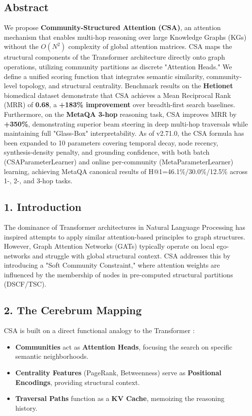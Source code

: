 
\subsection*{Abstract}
We propose \textbf{Community-Structured Attention (CSA)}, an attention mechanism that enables multi-hop reasoning over large Knowledge Graphs (KGs) without the $O(N^2)$ complexity of global attention matrices. CSA maps the structural components of the Transformer architecture \cite{vaswani2017attention} directly onto graph operations, utilizing community partitions as discrete "Attention Heads." We define a unified scoring function that integrates semantic similarity, community-level topology, and structural centrality. Benchmark results on the \textbf{Hetionet} \cite{hetionet2017} biomedical dataset demonstrate that CSA achieves a Mean Reciprocal Rank (MRR) of \textbf{0.68}, a \textbf{+183\% improvement} over breadth-first search baselines. Furthermore, on the \textbf{MetaQA 3-hop} \cite{metaqa2017} reasoning task, CSA improves MRR by \textbf{+350\%}, demonstrating superior beam steering in deep multi-hop traversals while maintaining full "Glass-Box" interpretability. As of v2.71.0, the CSA formula has been expanded to 10 parameters covering temporal decay, node recency, synthesis-density penalty, and grounding confidence, with both batch (CSAParameterLearner) and online per-community (MetaParameterLearner) learning, achieving MetaQA canonical results of H@1=46.1\%/30.0\%/12.5\% across 1-, 2-, and 3-hop tasks.

\subsection*{1. Introduction}
The dominance of Transformer architectures in Natural Language Processing has inspired attempts to apply similar attention-based principles to graph structures. However, Graph Attention Networks (GATs) \cite{velickovic2018gat} typically operate on local ego-networks and struggle with global structural context. CSA addresses this by introducing a "Soft Community Constraint," where attention weights are influenced by the membership of nodes in pre-computed structural partitions (DSCF/TSC).

\subsection*{2. The Cerebrum Mapping}
CSA is built on a direct functional analogy to the Transformer \cite{vaswani2017attention}:
\begin{itemize}
  \item \textbf{Communities} act as \textbf{Attention Heads}, focusing the search on specific semantic neighborhoods.
  \item \textbf{Centrality Features} (PageRank, Betweenness) serve as \textbf{Positional Encodings}, providing structural context.
  \item \textbf{Traversal Paths} function as a \textbf{KV Cache}, memoizing the reasoning history.
\end{itemize}


